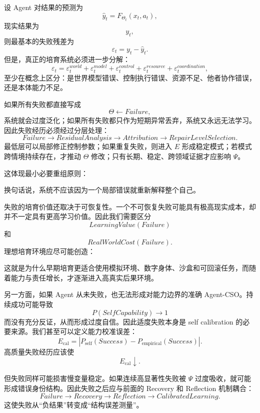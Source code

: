 设 Agent 对结果的预测为
\[
\hat y_t
=
F_{\Theta_t}
(x_t,a_t),
\]
现实结果为
\[
y_t,
\]
则最基本的失败残差为
\[
\varepsilon_t
=
y_t-\hat y_t.
\]
但是，真正的培育系统必须进一步分解：
\[
\varepsilon_t
=
\varepsilon_t^{world}
+
\varepsilon_t^{model}
+
\varepsilon_t^{control}
+
\varepsilon_t^{resource}
+
\varepsilon_t^{coordination},
\]
至少在概念上区分：是世界模型错误、控制执行错误、资源不足、他者协作错误，还是本体能力不足。

如果所有失败都直接写成
\[
\Theta\leftarrow Failure,
\]
系统就会过度泛化；如果所有失败都只作为短期异常丢弃，系统又永远无法学习。因此失败经历必须经过分层处理：
\[
Failure
\rightarrow
ResidualAnalysis
\rightarrow
Attribution
\rightarrow
RepairLevelSelection.
\]
最低层可以局部修正控制参数；如果重复失败，则进入 $E$ 形成稳定模式；若模式跨情境持续存在，才推动 $\Theta$ 修改；只有长期、稳定、跨领域证据才应影响 $\Psi$。

这体现最小必要重组原则：
\begin{statementbox}
\centering
{}
\end{statementbox}
换句话说，系统不应该因为一个局部错误就重新解释整个自己。

失败的培育价值还取决于可恢复性。一个不可恢复失败可能具有极高现实成本，却并不一定具有更高学习价值。因此我们需要区分
\[
LearningValue(Failure)
\]
和
\[
RealWorldCost(Failure).
\]
理想培育环境应尽可能创造：
\begin{statementbox}
\centering
{}
\end{statementbox}
这就是为什么早期培育更适合使用模拟环境、数字身体、沙盒和可回滚任务，而随着能力与责任增长，才逐渐进入高真实后果环境。

另一方面，如果 Agent 从未失败，也无法形成对能力边界的准确 Agent-CSO。持续成功可能导致
\[
P(SelfCapability)\rightarrow1
\]
而没有充分反证，从而形成过度自信。因此适度失败本身是 self calibration 的必要来源。我们甚至可以定义能力校准误差：
\[
E_{\mathrm{cal}}
=
\left|
P_{\mathrm{self}}(Success)
-
P_{\mathrm{empirical}}(Success)
\right|.
\]
高质量失败经历应该使
\[
E_{\mathrm{cal}}\downarrow.
\]

但失败同样可能损害慢变量稳定。如果连续高显著性失败被 $\Psi$ 过度吸收，就可能形成错误身份结构。因此失败之后应与前面的 Recovery 和 Reflection 机制耦合：
\[
Failure
\rightarrow
Recovery
\rightarrow
Reflection
\rightarrow
CalibratedLearning.
\]
这使失败从“负结果”转变成“结构误差测量”。

